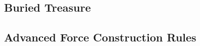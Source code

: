 \subsection{Buried Treasure}



\newpage

\subsection{Advanced Force Construction Rules}





\newpage
